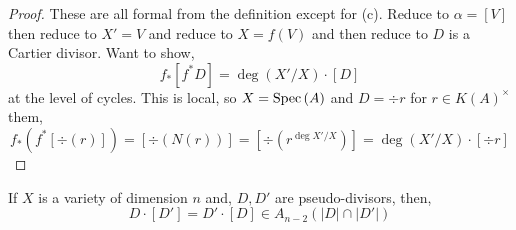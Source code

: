 \documentclass[12pt]{article}
\begin{document}
\begin{proof}
These are all formal from the definition except for (c). Reduce to $\alpha = [V]$ then reduce to $X' = V$ and reduce to $X = f(V)$ and then reduce to $D$ is a Cartier divisor. Want to show,
\[ f_* [f^* D] = \deg(X'/X) \cdot [D] \]
at the level of cycles. This is local, so $X = \mathrm{Spec}\left( A \right)$ and $D = \div{r}$ for $r \in K(A)^\times$ them,
\[ f_* (f^* [\div(r)]) = [\div(N(r))] = [\div(r^{\deg{X'/X}})] = \deg{(X'/X)} \cdot [\div{r}] \]
\end{proof}

\begin{theorem}
If $X$ is a variety of dimension $n$ and, $D, D'$ are pseudo-divisors, then,
\[ D \cdot [D'] = D' \cdot [D] \in A_{n-2}(|D| \cap |D'|) \]
\end{theorem}
\end{document}

